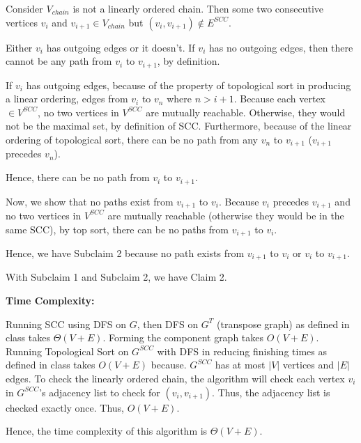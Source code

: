 \documentclass[a4paper]{report}
\begin{document}
\begin{enumerate}
      Consider $V_{chain}$ is not a linearly ordered chain. Then some two consecutive vertices $v_{i}$ and 
      $v_{i+1} \in V_{chain}$ but $(v_{i}, v_{i+1}) \not\in E^{SCC}$. 

      Either $v_{i}$ has outgoing edges or it doesn't. If $v_{i}$ has no outgoing edges, then there cannot be any path from
      $v_{i}$ to $v_{i+1}$, by definition. 

      If $v_{i}$ has outgoing edges, because of the property of topological sort in producing a linear ordering, edges from $v_{i}$ to 
      $v_{n}$ where $n > i+1$. Because each vertex $\in V^{SCC}$, no two vertices in $V^{SCC}$ are mutually reachable. Otherwise, 
      they would not be the maximal set, by definition of SCC. Furthermore, because of the linear ordering of topological sort, 
      there can be no path from any $v_{n}$ to $v_{i+1}$ ($v_{i+1}$ precedes $v_{n}$). 
      
      Hence, there can be no path from $v_{i}$ to $v_{i+1}$.

      Now, we show that no paths exist from $v_{i+1}$ to $v_{i}$.
      Because $v_{i}$ precedes $v_{i+1}$ and no two vertices in $V^{SCC}$ are mutually reachable (otherwise they would be in the same
      SCC), by top sort, there can be no paths from $v_{i+1}$ to $v_{i}$. 

      Hence, we have Subclaim 2 because no path exists from $v_{i+1}$ to $v_{i}$ or $v_{i}$ to $v_{i+1}$. 

      With Subclaim 1 and Subclaim 2, we have Claim 2. 


      {\bf Time Complexity:}
      
      Running SCC using DFS on $G$, then DFS on $G^{T}$ (transpose graph) as defined in class takes $\Theta(V+E)$.
      Forming the component graph takes $O(V+E)$. 
      Running Topological Sort on $G^{SCC}$ with DFS in reducing finishing times as defined in class takes $O(V+E)$ because.
      $G^{SCC}$ has at most $|V|$ vertices and $|E|$ edges. 
      To check the linearly ordered chain, the algorithm will check each vertex $v_{i}$ in $G^{SCC}$'s adjacency list to check for
      $(v_{i}, v_{i+1})$. Thus, the adjacency list is checked exactly once. Thus, $O(V+E)$.

      Hence, the time complexity of this algorithm is $\Theta(V+E)$.


    \par
    \pagebreak
    \bigskip
    \setcounter{equation}{0}


\end{enumerate}
\end{document}

